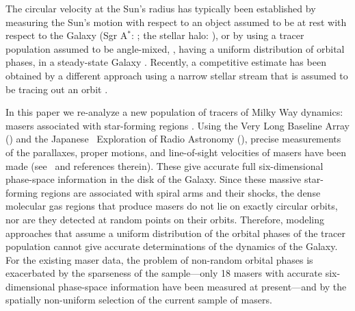 The circular velocity at the Sun's radius has typically been
established by measuring the Sun's motion with respect to an object
assumed to be at rest with respect to the Galaxy (Sgr A$^*$:
\citealt{Reid04a}; the stellar halo: \citealt{Sirko04a}), or by using
a tracer population assumed to be angle-mixed, \ie, having a uniform
distribution of orbital phases, in a steady-state Galaxy
\citep[\eg,][]{Feast97a}. Recently, a competitive estimate has been
obtained by a different approach using a narrow stellar stream that is
assumed to be tracing out an orbit \citep{Koposov09a}.

In this paper we re-analyze a new population of tracers of Milky Way
dynamics: masers associated with star-forming regions
\citep[\reid]{Reid09a}. Using the Very Long Baseline Array (\vlba) and
the Japanese \vlbi\ Exploration of Radio Astronomy (\vera), precise
measurements of the parallaxes, proper motions, and line-of-sight
velocities of masers have been made (see \reid\ and references
therein). These give accurate full six-dimensional phase-space
information in the disk of the Galaxy. Since these massive
star-forming regions are associated with spiral arms and their shocks,
the dense molecular gas regions that produce masers do not lie on
exactly circular orbits, nor are they detected at random points on
their orbits. Therefore, modeling approaches that assume a uniform
distribution of the orbital phases of the tracer population cannot
give accurate determinations of the dynamics of the Galaxy. For the
existing maser data, the problem of non-random orbital phases is
exacerbated by the sparseness of the sample---only 18 masers with
accurate six-dimensional phase-space information have been measured at
present---and by the spatially non-uniform selection of the current
sample of masers.

